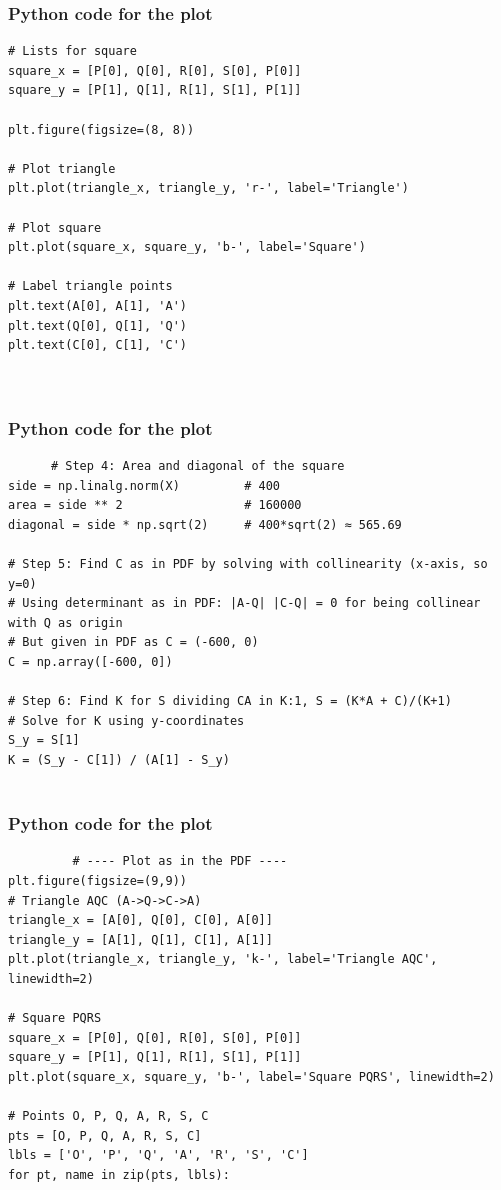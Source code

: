 \documentclass{beamer}
\begin{document}
\begin{frame}[fragile]
   \frametitle{Python code for the plot}
    \begin{lstlisting}
# Lists for square
square_x = [P[0], Q[0], R[0], S[0], P[0]]
square_y = [P[1], Q[1], R[1], S[1], P[1]]

plt.figure(figsize=(8, 8))

# Plot triangle
plt.plot(triangle_x, triangle_y, 'r-', label='Triangle')

# Plot square
plt.plot(square_x, square_y, 'b-', label='Square')

# Label triangle points
plt.text(A[0], A[1], 'A')
plt.text(Q[0], Q[1], 'Q')
plt.text(C[0], C[1], 'C')



 \end{lstlisting}
\end{frame}
 \begin{frame}[fragile]
       \frametitle{Python code for the plot}
       \begin{lstlisting}
      # Step 4: Area and diagonal of the square
side = np.linalg.norm(X)         # 400
area = side ** 2                 # 160000
diagonal = side * np.sqrt(2)     # 400*sqrt(2) ≈ 565.69

# Step 5: Find C as in PDF by solving with collinearity (x-axis, so y=0)
# Using determinant as in PDF: |A-Q| |C-Q| = 0 for being collinear with Q as origin
# But given in PDF as C = (-600, 0)
C = np.array([-600, 0])

# Step 6: Find K for S dividing CA in K:1, S = (K*A + C)/(K+1)
# Solve for K using y-coordinates
S_y = S[1]
K = (S_y - C[1]) / (A[1] - S_y)


    \end{lstlisting}
 \end{frame}
 \begin{frame}[fragile]
     \frametitle{Python code for the plot}
     \begin{lstlisting}
         # ---- Plot as in the PDF ----
plt.figure(figsize=(9,9))
# Triangle AQC (A->Q->C->A)
triangle_x = [A[0], Q[0], C[0], A[0]]
triangle_y = [A[1], Q[1], C[1], A[1]]
plt.plot(triangle_x, triangle_y, 'k-', label='Triangle AQC', linewidth=2)

# Square PQRS
square_x = [P[0], Q[0], R[0], S[0], P[0]]
square_y = [P[1], Q[1], R[1], S[1], P[1]]
plt.plot(square_x, square_y, 'b-', label='Square PQRS', linewidth=2)

# Points O, P, Q, A, R, S, C
pts = [O, P, Q, A, R, S, C]
lbls = ['O', 'P', 'Q', 'A', 'R', 'S', 'C']
for pt, name in zip(pts, lbls):
    

     \end{lstlisting}
 \end{frame}
\end{document}
